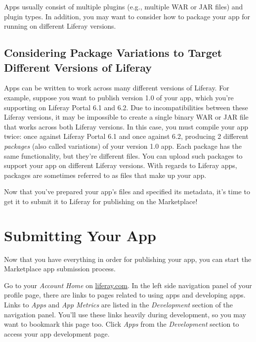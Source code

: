 \noindent\hrulefill

Apps usually consist of multiple plugins (e.g., multiple WAR or JAR
files) and plugin types. In addition, you may want to consider how to
package your app for running on different Liferay versions.

\subsection{Considering Package Variations to Target Different Versions
of
Liferay}\label{considering-package-variations-to-target-different-versions-of-liferay}

Apps can be written to work across many different versions of Liferay.
For example, suppose you want to publish version 1.0 of your app, which
you're supporting on Liferay Portal 6.1 and 6.2. Due to
incompatibilities between these Liferay versions, it may be impossible
to create a single binary WAR or JAR file that works across both Liferay
versions. In this case, you must compile your app twice: once against
Liferay Portal 6.1 and once against 6.2, producing 2 different
\emph{packages} (also called variations) of your version 1.0 app. Each
package has the same functionality, but they're different files. You can
upload such packages to support your app on different Liferay versions.
With regards to Liferay apps, packages are sometimes referred to as
files that make up your app.

Now that you've prepared your app's files and specified its metadata,
it's time to get it to submit it to Liferay for publishing on the
Marketplace!

\section{Submitting Your App}\label{submitting-your-app}

Now that you have everything in order for publishing your app, you can
start the Marketplace app submission process.

Go to your \emph{Account Home} on
\href{http://www.liferay.com}{liferay.com}. In the left side navigation
panel of your profile page, there are links to pages related to using
apps and developing apps. Links to \emph{Apps} and \emph{App Metrics}
are listed in the \emph{Development} section of the navigation panel.
You'll use these links heavily during development, so you may want to
bookmark this page too. Click \emph{Apps} from the \emph{Development}
section to access your app development page.

